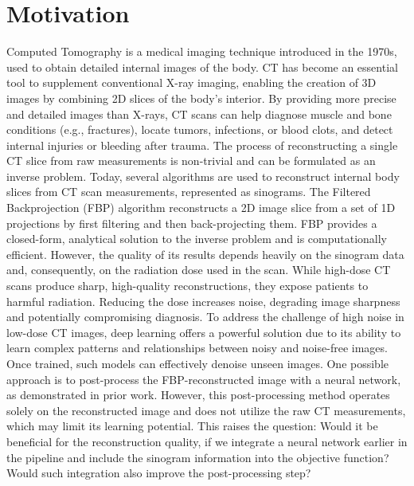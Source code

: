 \documentclass[12pt,a4paper]{article}
\begin{document}
\section{Motivation}

Computed Tomography is a medical imaging technique introduced in the 1970s, used to obtain detailed internal images of the body. CT has become an essential tool to supplement conventional X-ray imaging, enabling the creation of 3D images by combining 2D slices of the body's interior. By providing more precise and detailed images than X-rays, CT scans can help diagnose muscle and bone conditions (e.g., fractures), locate tumors, infections, or blood clots, and detect internal injuries or bleeding after trauma.
\newline\newline
The process of reconstructing a single CT slice from raw measurements is non-trivial and can be formulated as an inverse problem. Today, several algorithms are used to reconstruct internal body slices from CT scan measurements, represented as sinograms. The Filtered Backprojection (FBP) algorithm reconstructs a 2D image slice from a set of 1D projections by first filtering and then back-projecting them. FBP provides a closed-form, analytical solution to the inverse problem and is computationally efficient. However, the quality of its results depends heavily on the sinogram data and, consequently, on the radiation dose used in the scan. While high-dose CT scans produce sharp, high-quality reconstructions, they expose patients to harmful radiation. Reducing the dose increases noise, degrading image sharpness and potentially compromising diagnosis.
\newline\newline
To address the challenge of high noise in low-dose CT images, deep learning offers a powerful solution due to its ability to learn complex patterns and relationships between noisy and noise-free images. Once trained, such models can effectively denoise unseen images. One possible approach is to post-process the FBP-reconstructed image with a neural network, as demonstrated in prior work. However, this post-processing method operates solely on the reconstructed image and does not utilize the raw CT measurements, which may limit its learning potential.
\newline\newline
This raises the question: Would it be beneficial for the reconstruction quality, if we integrate a neural network earlier in the pipeline and include the sinogram information into the objective function? Would such integration also improve the post-processing step?
\newpage
\end{document}
